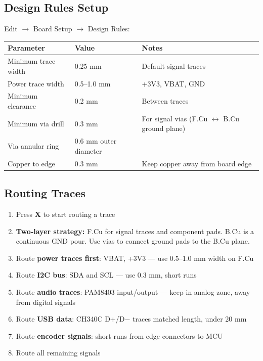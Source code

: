 \documentclass[a4paper,11pt]{article}
\renewcommand*{\,}{ }%
\begin{document}
\subsection{Design Rules Setup}

Edit $\rightarrow$ Board Setup $\rightarrow$ Design Rules:

\begin{longtable}{@{}p{5cm}p{3cm}p{5cm}@{}}
\toprule
\textbf{Parameter} & \textbf{Value} & \textbf{Notes} \\
\midrule
\endhead
Minimum trace width & 0.25\,mm & Default signal traces \\
Power trace width & 0.5--1.0\,mm & +3V3, VBAT, GND \\
Minimum clearance & 0.2\,mm & Between traces \\
Minimum via drill & 0.3\,mm & For signal vias (F.Cu $\leftrightarrow$ B.Cu ground plane) \\
Via annular ring & 0.6\,mm outer diameter & \\
Copper to edge & 0.3\,mm & Keep copper away from board edge \\
\bottomrule
\end{longtable}

\subsection{Routing Traces}

\begin{enumerate}
    \item Press \textbf{X} to start routing a trace
    \item \textbf{Two-layer strategy:} F.Cu for signal traces and component pads. B.Cu is a continuous GND pour. Use vias to connect ground pads to the B.Cu plane.
    \item Route \textbf{power traces first}: VBAT, +3V3 --- use 0.5--1.0\,mm width on F.Cu
    \item Route \textbf{I2C bus}: SDA and SCL --- use 0.3\,mm, short runs
    \item Route \textbf{audio traces}: PAM8403 input/output --- keep in analog zone, away from digital signals
    \item Route \textbf{USB data}: CH340C D+/D$-$ traces matched length, under 20\,mm
    \item Route \textbf{encoder signals}: short runs from edge connectors to MCU
    \item Route all remaining signals
\end{enumerate}
\end{document}
